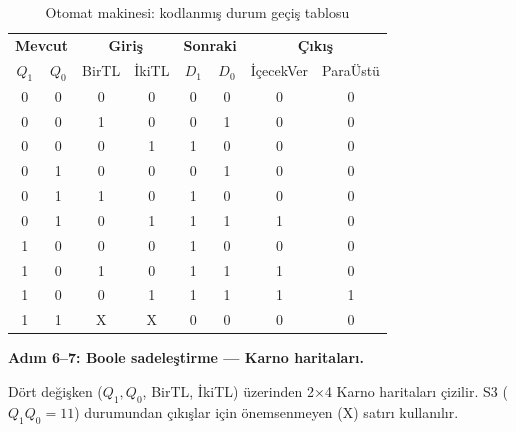 \begin{ornek}[B.16]
\begin{table}[H]
\centering
\caption*{Otomat makinesi: kodlanmış durum geçiş tablosu}
\label{tab:B.otomat-kodlu}
\small
\begin{tabular}{cc|cc|cc|cc}
\toprule
\multicolumn{2}{c|}{\textbf{Mevcut}} &
\multicolumn{2}{c|}{\textbf{Giriş}} &
\multicolumn{2}{c|}{\textbf{Sonraki}} &
\multicolumn{2}{c}{\textbf{Çıkış}} \\
$Q_1$ & $Q_0$ & BirTL & İkiTL & $D_1$ & $D_0$ & İçecekVer & ParaÜstü \\
\midrule
0 & 0 & 0 & 0 & 0 & 0 & 0 & 0 \\
0 & 0 & 1 & 0 & 0 & 1 & 0 & 0 \\
0 & 0 & 0 & 1 & 1 & 0 & 0 & 0 \\
0 & 1 & 0 & 0 & 0 & 1 & 0 & 0 \\
0 & 1 & 1 & 0 & 1 & 0 & 0 & 0 \\
0 & 1 & 0 & 1 & 1 & 1 & 1 & 0 \\
1 & 0 & 0 & 0 & 1 & 0 & 0 & 0 \\
1 & 0 & 1 & 0 & 1 & 1 & 1 & 0 \\
1 & 0 & 0 & 1 & 1 & 1 & 1 & 1 \\
1 & 1 & X & X & 0 & 0 & 0 & 0 \\
\bottomrule
\end{tabular}
\end{table}

\textbf{Adım 6--7: Boole sadeleştirme — Karno haritaları.}

Dört değişken ($Q_1, Q_0$, BirTL, İkiTL) üzerinden 2$\times$4 Karno haritaları çizilir. S3 ($Q_1 Q_0 = 11$) durumundan çıkışlar için önemsenmeyen (X) satırı kullanılır.

\newcommand{\otomatkarno}[5]{%
\begin{tikzpicture}[scale=0.6]
    \draw[thick] (0,0) grid (4,4);
    \node[above left, font=\footnotesize] at (0, 4) {$Q_1Q_0$\textbackslash\,BirTL\,İkiTL};
    \node[above, font=\footnotesize] at (0.5, 4) {00};
    \node[above, font=\footnotesize] at (1.5, 4) {01};
    \node[above, font=\footnotesize] at (2.5, 4) {11};
    \node[above, font=\footnotesize] at (3.5, 4) {10};
    \node[left, font=\footnotesize] at (0, 3.5) {00};
    \node[left, font=\footnotesize] at (0, 2.5) {01};
    \node[left, font=\footnotesize] at (0, 1.5) {11};
    \node[left, font=\footnotesize] at (0, 0.5) {10};
    #1 #2 #3 #4 #5
\end{tikzpicture}%
}


\end{ornek}
